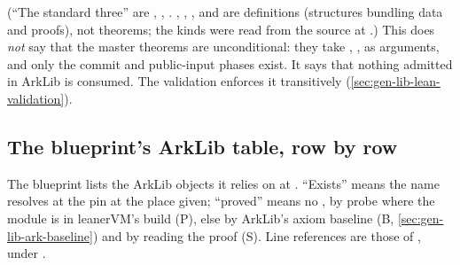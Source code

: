 (\enquote{The standard three} are , , .
, , ,
 and  are definitions (structures bundling data
and proofs), not theorems; the kinds were read from the source at .) This does
\emph{not} say that the master theorems are unconditional: they take ,
,  as arguments, and only the commit and public-input
phases exist. It says that nothing admitted in ArkLib is consumed. The validation enforces it
transitively (\cref{sec:gen-lib-lean-validation}).

\subsection{The blueprint's ArkLib table, row by row}\label{sec:gen-lib-ark-table}

The blueprint lists the ArkLib objects it relies on at \allowbreak{}\allowbreak{}.
\enquote{Exists} means the name resolves at the pin at the place given; \enquote{proved} means no
, by probe where the module is in leanerVM's build (P), else by ArkLib's axiom
baseline (B, \cref{sec:gen-lib-ark-baseline}) and by reading the proof (S). Line references are
those of , under \allowbreak{}\allowbreak{}\allowbreak{}.


